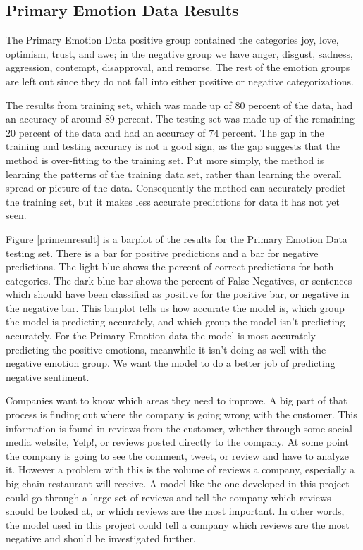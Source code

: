 \documentclass[titlepage,letterpaper]{article}
\begin{document}
\subsection{Primary Emotion Data Results}
The Primary Emotion Data positive group contained the categories joy, love, optimism, trust, and awe; in the negative group we have anger, disgust, sadness, aggression, contempt, disapproval, and remorse. The rest of the emotion groups are left out since they do not fall into either positive or negative categorizations.

The results from training set, which was made up of $80$ percent of the data, had an accuracy of around $89$ percent. The testing set was made up of the remaining $20$ percent of the data and had an accuracy of $74$ percent. The gap in the training and testing accuracy is not a good sign, as the gap suggests that the method is over-fitting to  the training set. Put more simply, the method is learning the patterns of the training data set, rather than learning the overall spread or picture of the data. Consequently the method can accurately predict the training set, but it makes less accurate predictions for data it has not yet seen.

Figure \ref{primemresult} is a barplot of the results for the Primary Emotion Data testing set. There is a bar for positive predictions and a bar for negative predictions. The light blue shows the percent of correct predictions for both categories. The dark blue bar shows the percent of False Negatives, or sentences which should have been classified as positive for the positive bar, or negative in the negative bar. This barplot tells us how accurate the model is, which group the model is predicting accurately, and which group the model isn't predicting accurately. For the Primary Emotion data the model is most accurately predicting the positive emotions, meanwhile it isn't doing as well with the negative emotion group. We want the model to do a better job of predicting negative sentiment. 

Companies want to know which areas they need to improve. A big part of that process is finding out where the company is going wrong with the customer. This information is found in reviews from the customer, whether through some social media website, Yelp!, or reviews posted directly to the company. At some point the company is going to see the comment, tweet, or review and have to analyze it. However a problem with this is the volume of reviews a company, especially a big chain restaurant will receive. A model like the one developed in this project could go through a large set of reviews and tell the company which reviews should be looked at, or which reviews are the most important. In other words, the model used in this project could tell a company which reviews are the most negative and should be investigated further.   
\end{document}
